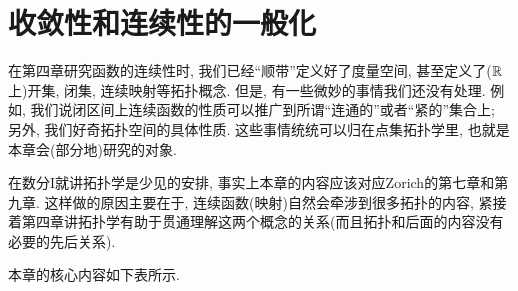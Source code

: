 \chapter{收敛性和连续性的一般化}

在第四章研究函数的连续性时, 我们已经“顺带”定义好了度量空间, 甚至定义了($\mathbb{R}$上)开集, 闭集, 连续映射等拓扑概念. 但是, 有一些微妙的事情我们还没有处理. 例如, 我们说闭区间上连续函数的性质可以推广到所谓“连通的”或者“紧的”集合上; 另外, 我们好奇拓扑空间的具体性质. 这些事情统统可以归在点集拓扑学里, 也就是本章会(部分地)研究的对象. 

在数分I就讲拓扑学是少见的安排, 事实上本章的内容应该对应Zorich的第七章和第九章. 这样做的原因主要在于, 连续函数(映射)自然会牵涉到很多拓扑的内容, 紧接着第四章讲拓扑学有助于贯通理解这两个概念的关系(而且拓扑和后面的内容没有必要的先后关系). 

本章的核心内容如下表所示. 

